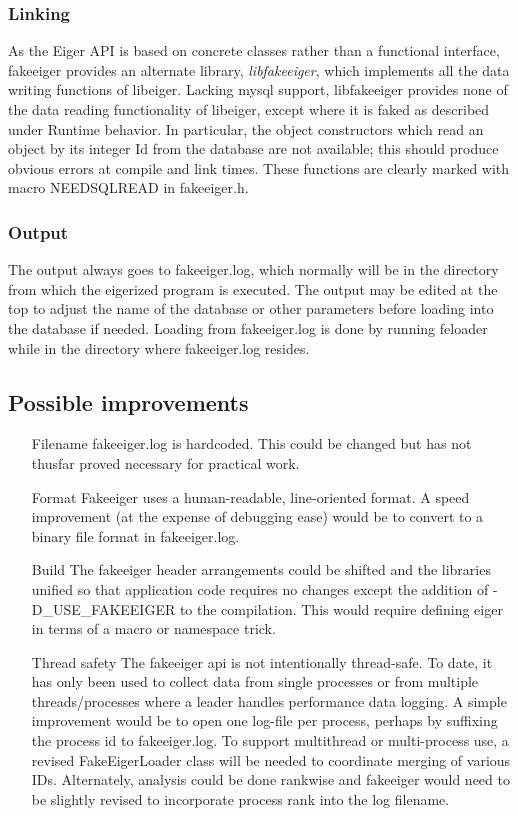 \subsubsection{Linking} As the Eiger API is based on concrete classes rather than a functional interface, fakeeiger provides an alternate library, {\em libfakeeiger}, which implements all the data writing functions of libeiger. Lacking mysql support, libfakeeiger provides none of the data reading functionality of libeiger, except where it is faked as described under Runtime behavior. In particular, the object constructors which read an object by its integer Id from the database are not available; this should produce obvious errors at compile and link times. These functions are clearly marked with macro NEEDSQLREAD in fakeeiger.h.

\subsubsection{Output} The output always goes to fakeeiger.log, which normally will be in the directory from which the eigerized program is executed. The output may be edited at the top to adjust the name of the database or other parameters before loading into the database if needed. Loading from fakeeiger.log is done by running feloader while in the directory where fakeeiger.log resides.



\subsection{Possible improvements}

\begin{itemize}
\item[Filename] fakeeiger.log is hardcoded. This could be changed but has not thusfar proved necessary for practical work.
\item[Format] Fakeeiger uses a human-readable, line-oriented format. A speed improvement (at the expense of debugging ease) would be to convert to a binary file format in fakeeiger.log.
\item[Build] The fakeeiger header arrangements could be shifted and the libraries unified so that application code requires no changes except the addition of -D\_USE\_FAKEEIGER to the compilation. This would require defining eiger in terms of a macro or namespace trick.
\item[Thread safety] The fakeeiger api is not intentionally thread-safe. To date, it has only been used to collect data from single processes or from multiple threads/processes where a leader handles performance data logging. A simple improvement would be to open one log-file per process, perhaps by suffixing the process id to fakeeiger.log. To support multithread or multi-process use, a revised FakeEigerLoader class will be needed to coordinate merging of various IDs. Alternately, analysis could be done rankwise and fakeeiger would need to be slightly revised to incorporate process rank into the log filename.
\end{itemize}
